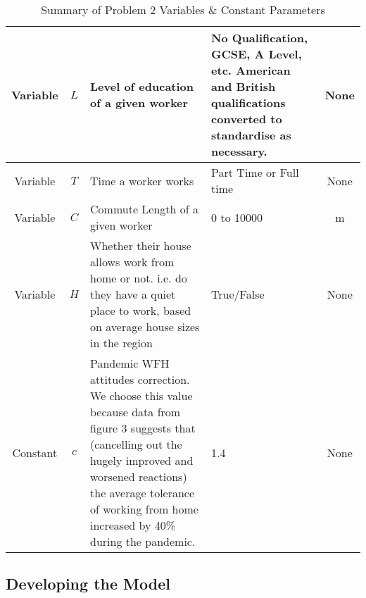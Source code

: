 \begin{table}[H]
\begin{center}
\begin{tabular}{|c|c|p{6cm}|p{6cm}|c|}
                      \midrule 
                       Variable & \(L\) & Level of education of a given worker & No Qualification, GCSE, A Level, etc. American and British qualifications converted to standardise as necessary. & None  \\ %
                      \midrule 
                       Variable & \(T\) & Time a worker works & Part Time or Full time & None  \\ %
                      \midrule 
                       Variable & \(C\) & Commute Length of a given worker & 0 to 10000 & m  \\ %
                      \midrule 
                       Variable & \(H\) & Whether their house allows work from home or not. i.e. do they have a quiet place to work, based on average house sizes in the region & True/False & None\\
                      \midrule 
                       Constant & \(c\) & Pandemic WFH attitudes correction. We choose this value because data from \cite{VOXEU} figure 3 suggests that (cancelling out the hugely improved and worsened reactions) the average tolerance of working from home increased by 40\% during the pandemic. & 1.4 & None\\
                      \bottomrule 
                    \end{tabular}
                    \caption{Summary of Problem 2 Variables \& Constant Parameters}                
                  \end{center}
                \end{table}
            
 
        \subsection{Developing the Model}  

